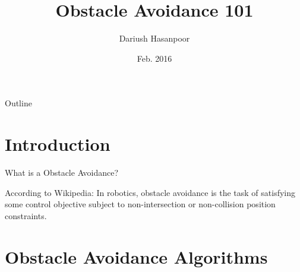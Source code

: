 \documentclass[8pt]{beamer}
\title[\scalebox{.8}{Obstacle Avoidance 101}]{Obstacle Avoidance 101}
\author[\scalebox{.8}{Dariush Hasanpoor}]{Dariush Hasanpoor}
\institute[]{Isfahan University Of Technology}
\date[\scalebox{.8}{Isfahan University Of Technology}]{Feb. 2016}
\renewcommand{\|}[1][.3em]{\hspace{#1}|\hspace{#1}}
\renewcommand{\,}[1][.3em]{,\hspace{#1}}
\begin{document}
\begin{frame}
  \titlepage
\end{frame}

\begin{frame}{Outline}
  \tableofcontents[hideallsubsections]
\end{frame}

\section{Introduction}
\frame{\tableofcontents[currentsection]}

\begin{frame}{What is a Obstacle Avoidance?}
\begin{block}{According to Wikipedia:}
In robotics, obstacle avoidance is the task of satisfying some control objective subject to non-intersection or non-collision position constraints.
\end{block}
\end{frame}

\section{Obstacle Avoidance Algorithms}
\frame{\tableofcontents[currentsection]}
\end{document}
